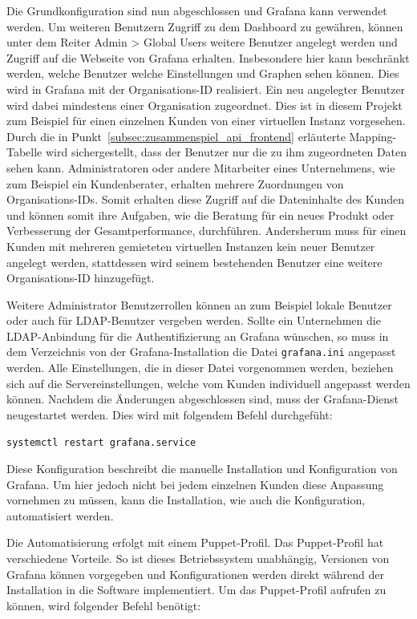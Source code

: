 Die Grundkonfiguration sind nun abgeschlossen und Grafana kann verwendet
werden. Um weiteren Benutzern Zugriff zu dem \gls{Dashboard} zu gewähren,
können unter dem Reiter Admin > Global Users weitere Benutzer angelegt werden
und Zugriff auf die Webseite von Grafana erhalten. Insbesondere hier kann
beschränkt werden, welche Benutzer welche Einstellungen und Graphen sehen
können. Dies wird in Grafana mit der Organisations\hyp{}ID realisiert. Ein neu
angelegter Benutzer wird dabei mindestens einer Organisation zugeordnet. Dies
ist in diesem Projekt zum Beispiel für einen einzelnen Kunden von einer
virtuellen Instanz vorgesehen. Durch die in
Punkt~\ref{subsec:zusammenspiel_api_frontend} erläuterte Mapping\hyp{}Tabelle
wird sichergestellt, dass der Benutzer nur die zu ihm zugeordneten Daten sehen
kann. Administratoren oder andere Mitarbeiter eines Unternehmens, wie zum
Beispiel ein Kundenberater, erhalten mehrere Zuordnungen von
Organisations\hyp{}IDs. Somit erhalten diese Zugriff auf die Dateninhalte des
Kunden und können somit ihre Aufgaben, wie die Beratung für ein neues Produkt
oder Verbesserung der Gesamtperformance, durchführen. Andersherum muss für
einen Kunden mit mehreren gemieteten virtuellen Instanzen kein neuer Benutzer
angelegt werden, stattdessen wird seinem bestehenden Benutzer eine weitere
Organisations\hyp{}ID hinzugefügt.

Weitere Administrator Benutzerrollen können an zum Beispiel lokale Benutzer
oder auch für \gls{LDAP}\hyp{}Benutzer vergeben werden. Sollte ein Unternehmen
die \gls{LDAP}\hyp{}Anbindung für die Authentifizierung an Grafana wünschen, so
muss in dem Verzeichnis von der Grafana\hyp{}Installation die Datei
\texttt{grafana.ini} angepasst werden. Alle Einstellungen, die in dieser Datei
vorgenommen werden, beziehen sich auf die Servereinstellungen, welche vom
Kunden individuell angepasst werden können. Nachdem die Änderungen
abgeschlossen sind, muss der Grafana\hyp{}Dienst neugestartet werden. Dies wird
mit folgendem Befehl durchgefüht:

\begin{verbatim}
systemctl restart grafana.service
\end{verbatim}

Diese Konfiguration beschreibt die manuelle Installation und Konfiguration von
Grafana. Um hier jedoch nicht bei jedem einzelnen Kunden diese Anpassung
vornehmen zu müssen, kann die Installation, wie auch die Konfiguration,
automatisiert werden.

Die Automatisierung erfolgt mit einem Puppet\hyp{}Profil. Das
Puppet\hyp{}Profil hat verschiedene Vorteile. So ist dieses Betriebssystem
unabhängig, Versionen von Grafana können vorgegeben und Konfigurationen werden
direkt während der Installation in die Software implementiert. Um das
Puppet\hyp{}Profil aufrufen zu können, wird folgender Befehl benötigt:


